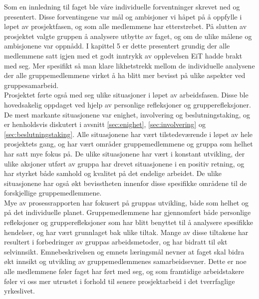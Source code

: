 
Som en innledning til faget ble våre individuelle forventninger skrevet ned og presentert. Disse forventingene var mål og ambisjoner vi håpet på å oppfylle i løpet av prosjektfasen, og som alle medlemmene har etterstrebet. På slutten av prosjektet valgte gruppen å analysere utbytte av faget, og om de ulike målene og ambisjonene var oppnådd. I kapittel 5 er dette presentert grundig der alle medlemmene satt igjen med et godt inntrykk av opplevelsen EiT hadde brakt med seg. Mer spesifikt så man klare likhetstrekk mellom de individuelle analysene der alle gruppemedlemmene virket å ha blitt mer bevisst på ulike aspekter ved gruppesamarbeid.\\

Prosjektet førte også med seg ulike situasjoner i løpet av arbeidsfasen. Disse ble hovedsakelig oppdaget ved hjelp av personlige refleksjoner og grupperefleksjoner. De mest markante situasjonene var enighet, involvering og beslutningstaking, og er henholdsvis diskutert i avsnitt \ref{sec:enighet},  \ref{sec:involvering} og  \ref{sec:beslutningstaking}. Alle situasjonene har vært tilstedeværende i løpet av hele prosjektets gang, og har vært områder gruppemedlemmene og gruppa som helhet har satt mye fokus på. De ulike situasjonene har vært i konstant utvikling, der ulike aksjoner utført av gruppa har drevet situasjonene i en positiv retning, og har styrket både samhold og kvalitet på det endelige arbeidet. De ulike situasjonene har også økt bevisstheten innenfor disse spesifikke områdene til de forskjellige gruppemedlemmene.\\

Mye av prosessrapporten har fokusert på gruppas utvikling, både som helhet og på det individuelle planet. Gruppemedlemmene har gjennomført både personlige refleksjoner og grupperefleksjoner som har blitt benyttet til å analysere spesifikke hendelser, og har vært grunnlaget bak ulike tiltak. Mange av disse tiltakene har resultert i forbedringer av gruppas arbeidsmetoder, og har bidratt til økt selvinnsikt. Emnebeskrivelsen og emnets læringsmål nevner at faget skal bidra økt innsikt og utvikling av gruppemedlemmenes samarbeidsevner. Dette er noe alle medlemmene føler faget har ført med seg, og som framtidige arbeidstakere føler vi oss mer utrustet i forhold til senere prosjektarbeid i det tverrfaglige yrkeslivet.

